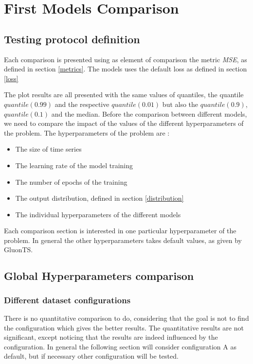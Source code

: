 
\section{First Models Comparison}
\label{part3}

\subsection{Testing protocol definition}


Each comparison is presented using as element of comparison the metric \textit{MSE}, as defined in section \ref{metrics}.
The models uses the default loss as defined in section \ref{loss}

The plot results are all presented with the same values of quantiles, the quantile $quantile(0.99)$ and the respective $quantile(0.01)$ but also the $quantile(0.9)$, $quantile(0.1)$ and the median.
Before the comparison between different models, we need to compare the impact of the values of the different hyperparameters of the problem.
The hyperparameters of the problem are :
\begin{itemize}
    \item The size of time series
    \item The learning rate of the model training
    \item The number of epochs of the training
    \item The output distribution, defined in section \ref{distribution}
    \item The individual hyperparameters of the different models
\end{itemize}
Each comparison section is interested in one particular hyperparameter of the problem.
In general the other hyperparameters takes default values, as given by GluonTS.

\subsection{Global Hyperparameters comparison}

\subsubsection{Different dataset configurations}

There is no quantitative comparison to do, considering that the goal is not to find the configuration which gives the better results. The quantitative results are not significant, except noticing that the results are indeed influenced by the configuration. 
In general the following section will consider configuration A as default, but if necessary other configuration will be tested.

